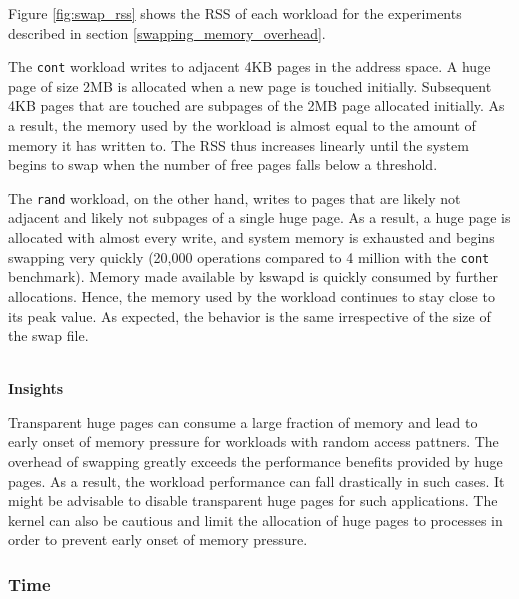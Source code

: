 \documentclass[twocolumn,11pt]{article}
\begin{document}
Figure \ref{fig:swap_rss} shows the RSS of each workload for the
experiments described in section \ref{swapping_memory_overhead}. 

The \texttt{cont} workload writes to adjacent 4KB pages in the address space. A huge page
of size 2MB is allocated when a new page is touched initially. Subsequent 4KB
pages that are touched are subpages of the 2MB page allocated initially. As a
result, the memory used by the workload is almost equal to the amount of memory
it has written to. The RSS thus increases linearly until the system begins to
swap when the number of free pages falls below a threshold. 

The \texttt{rand} workload, on the other hand, writes to pages that are likely not
adjacent and likely not subpages of a single huge page. As a result, a huge page
is allocated with almost every write, and system memory is exhausted and begins
swapping very quickly (20,000 operations compared to 4 million with the \texttt{cont} benchmark). Memory made available by kswapd is quickly consumed by
further allocations. Hence, the memory used by the workload continues to stay
close to its peak value. As expected, the behavior is the same irrespective of
the size of the swap file.


~\\ \textbf{Insights} 

Transparent huge pages can consume a large fraction of memory and lead to early
onset of memory pressure for workloads with random access pattners. The overhead of swapping greatly exceeds the
performance benefits provided by huge pages. As a result, the workload
performance can fall drastically in such cases. It might be advisable to
disable transparent huge pages for such applications. The kernel can also be
cautious and limit the allocation of huge pages to processes in order to
prevent early onset of memory pressure.

\subsubsection{Time}
\end{document}
